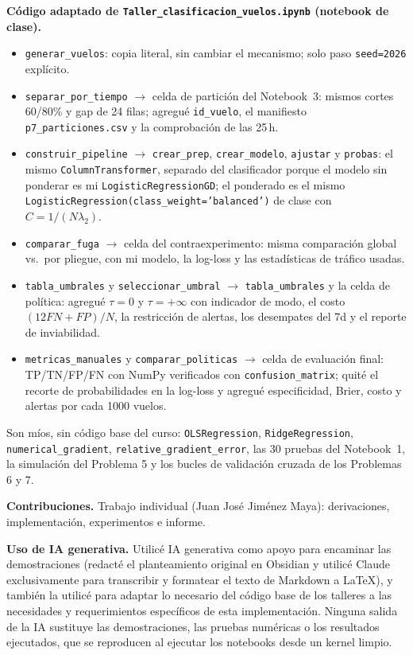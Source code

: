 \documentclass[10pt,a4paper]{article}
\begin{document}
\textbf{Código adaptado de \texttt{Taller\_clasificacion\_vuelos.ipynb} (notebook de clase).}
\begin{itemize}
\item \texttt{generar\_vuelos}: copia literal, sin cambiar el mecanismo; solo paso \texttt{seed=2026} explícito.
\item \texttt{separar\_por\_tiempo} $\to$ celda de partición del Notebook~3: mismos cortes 60/80\% y gap de 24 filas; agregué \texttt{id\_vuelo}, el manifiesto \texttt{p7\_particiones.csv} y la comprobación de las 25\,h.
\item \texttt{construir\_pipeline} $\to$ \texttt{crear\_prep}, \texttt{crear\_modelo}, \texttt{ajustar} y \texttt{probas}: el mismo \texttt{ColumnTransformer}, separado del clasificador porque el modelo sin ponderar es mi \texttt{LogisticRegressionGD}; el ponderado es el mismo \texttt{LogisticRegression(class\_weight='balanced')} de clase con $C=1/(N\lambda_2)$.
\item \texttt{comparar\_fuga} $\to$ celda del contraexperimento: misma comparación global vs.\ por pliegue, con mi modelo, la log-loss y las estadísticas de tráfico usadas.
\item \texttt{tabla\_umbrales} y \texttt{seleccionar\_umbral} $\to$ \texttt{tabla\_umbrales} y la celda de política: agregué $\tau=0$ y $\tau=+\infty$ con indicador de modo, el costo $(12FN+FP)/N$, la restricción de alertas, los desempates del 7d y el reporte de inviabilidad.
\item \texttt{metricas\_manuales} y \texttt{comparar\_politicas} $\to$ celda de evaluación final: TP/TN/FP/FN con NumPy verificados con \texttt{confusion\_matrix}; quité el recorte de probabilidades en la log-loss y agregué especificidad, Brier, costo y alertas por cada 1000 vuelos.
\end{itemize}
{\sloppy Son míos, sin código base del curso: \texttt{OLSRegression}, \texttt{RidgeRegression}, \texttt{numerical\_gradient}, \texttt{relative\_gradient\_error}, las 30 pruebas del Notebook~1, la simulación del Problema 5 y los bucles de validación cruzada de los Problemas 6 y 7.\par}

\textbf{Contribuciones.} Trabajo individual (Juan José Jiménez Maya): derivaciones, implementación, experimentos e informe.

\textbf{Uso de IA generativa.} Utilicé IA generativa como apoyo para encaminar las demostraciones (redacté el planteamiento original en Obsidian y utilicé Claude exclusivamente para transcribir y formatear el texto de Markdown a LaTeX), y también la utilicé para adaptar lo necesario del código base de los talleres a las necesidades y requerimientos específicos de esta implementación. Ninguna salida de la IA sustituye las demostraciones, las pruebas numéricas o los resultados ejecutados, que se reproducen al ejecutar los notebooks desde un kernel limpio.
\end{document}
